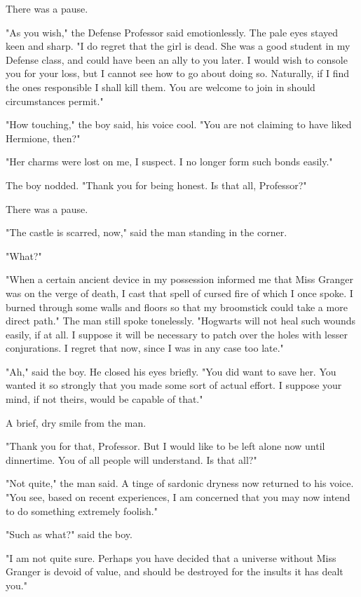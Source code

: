 There was a pause.

"As you wish," the Defense Professor said emotionlessly. The pale eyes stayed keen and sharp. "I do regret that the girl is dead. She was a good student in my Defense class, and could have been an ally to you later. I would wish to console you for your loss, but I cannot see how to go about doing so. Naturally, if I find the ones responsible I shall kill them. You are welcome to join in should circumstances permit."

"How touching," the boy said, his voice cool. "You are not claiming to have liked Hermione, then?"

"Her charms were lost on me, I suspect. I no longer form such bonds easily."

The boy nodded. "Thank you for being honest. Is that all, Professor?"

There was a pause.

"The castle is scarred, now," said the man standing in the corner.

"What?"

"When a certain ancient device in my possession informed me that Miss Granger was on the verge of death, I cast that spell of cursed fire of which I once spoke. I burned through some walls and floors so that my broomstick could take a more direct path." The man still spoke tonelessly. "Hogwarts will not heal such wounds easily, if at all. I suppose it will be necessary to patch over the holes with lesser conjurations. I regret that now, since I was in any case too late."

"Ah," said the boy. He closed his eyes briefly. "You did want to save her. You wanted it so strongly that you made some sort of actual effort. I suppose your mind, if not theirs, would be capable of that."

A brief, dry smile from the man.

"Thank you for that, Professor. But I would like to be left alone now until dinnertime. You of all people will understand. Is that all?"

"Not quite," the man said. A tinge of sardonic dryness now returned to his voice. "You see, based on recent experiences, I am concerned that you may now intend to do something extremely foolish."

"Such as what?" said the boy.

"I am not quite sure. Perhaps you have decided that a universe without Miss Granger is devoid of value, and should be destroyed for the insults it has dealt you."

